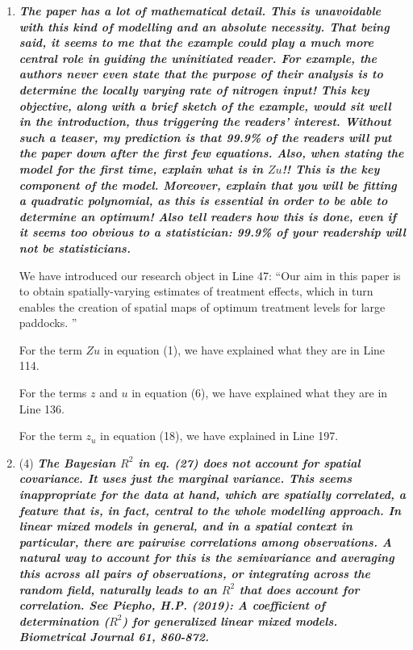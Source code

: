 \documentclass[a4paper]{article}   	%
\newcommand{\qtitle}[1]{\textit{\textbf{#1}}}
\begin{document}
\begin{enumerate}
    \item \qtitle{The paper has a lot of mathematical detail. This is unavoidable with this kind of modelling and an absolute necessity. That being said, it seems to me that the example could play a much more central role in guiding the uninitiated reader. For example, the authors never even state that the purpose of their analysis is to determine the locally varying rate of nitrogen input! This key objective, along with a brief sketch of the example, would sit well in the introduction, thus triggering the readers' interest. Without such a teaser, my prediction is that 99.9\% of the readers will put the paper down after the first few equations. Also, when stating the model for the first time, explain what is in $Zu$!! This is the key component of the model. Moreover, explain that you will be fitting a quadratic polynomial, as this is essential in order to be able to determine an optimum! Also tell readers how this is done, even if it seems too obvious to a statistician: 99.9\% of your readership will not be statisticians.}

    We have introduced our research object in Line 47: ``Our  aim  in  this  paper  is to  obtain  spatially-varying  estimates  of  treatment  effects,  which  in  turn  enables  the creation of spatial maps of optimum treatment levels for large paddocks. ''
    
    For the term $Zu$ in equation (1), we have explained what they are in Line 114. 
    
    For the terms $z$ and $u$ in equation (6), we have explained what they are in Line 136. 
    
    For the term $z_u$ in equation (18), we have explained in Line 197. 
    
    \item (4) \qtitle{The Bayesian $R^2$ in eq. (27) does not account for spatial covariance. It uses just the marginal variance. This seems inappropriate for the data at hand, which are spatially correlated, a feature that is, in fact, central to the whole modelling approach. In linear mixed models in general, and in a spatial context in particular, there are pairwise correlations among observations. A natural way to account for this is the semivariance and averaging this across all pairs of observations, or integrating across the random field, naturally leads to an $R^2$ that does account for correlation. See Piepho, H.P. (2019): A coefficient of determination ($R^2$) for generalized linear mixed models. Biometrical Journal 61, 860-872.}
        

\end{enumerate}
\end{document}
